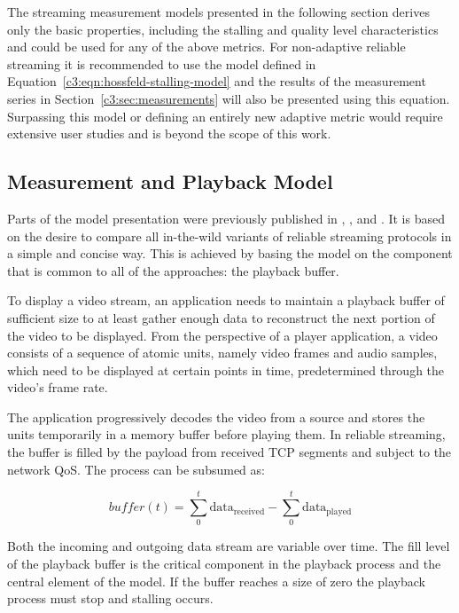 The streaming measurement models presented in the following section derives only the basic properties, including the stalling and quality level characteristics and could be used for any of the above metrics. For non-adaptive reliable streaming it is recommended to use the model defined in Equation~\ref{c3:eqn:hossfeld-stalling-model} and the results of the measurement series in Section~\ref{c3:sec:measurements} will also be presented using this equation. Surpassing this model or defining an entirely new adaptive metric would require extensive user studies and is beyond the scope of this work.

\subsection{Measurement and Playback Model}
\label{c3:sec:model}

Parts of the model presentation were previously published in \cite{cs3518}, \cite{metzger2011delivery}, and \cite{6229739}. It is based on the desire to compare all in-the-wild variants of reliable streaming protocols in a simple and concise way. This is achieved by basing the model on the component that is common to all of the approaches: the playback buffer.

To display a video stream, an application needs to maintain a playback buffer of sufficient size to at least gather enough data to reconstruct the next portion of the video to be displayed. From the perspective of a player application, a video consists of a sequence of atomic units, namely video frames and audio samples, which need to be displayed at certain points in time, predetermined through the video's frame rate. 

The application progressively decodes the video from a source and stores the units temporarily in a memory buffer before playing them. In reliable streaming, the buffer is filled by the payload from received \gls{TCP} segments and subject to the network \gls{QoS}. The process can be subsumed as:

\begin{equation*}
	\mathit{buffer}(t) = \sum_{0}^{t} \text{data}_\mathrm{received} - \sum_{0}^{t} \text{data}_\mathrm{played}
\end{equation*}

Both the incoming and outgoing data stream are variable over time. The fill level of the playback buffer is the critical component in the playback process and the central element of the model. If the buffer reaches a size of zero the playback process must stop and stalling occurs.

